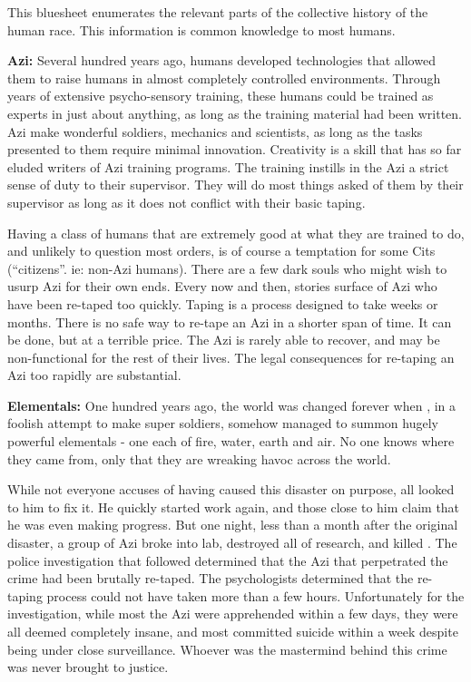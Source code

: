 \documentclass[blue]{elementals}
\begin{document}
\name{\bHumanHistory{}}

This bluesheet enumerates the relevant parts of the collective history of the human race. This information is common knowledge to most humans.

{\bf Azi:} %
Several hundred years ago, humans developed technologies that allowed them to raise humans in almost completely controlled environments. Through years of extensive psycho-sensory training, these humans could be trained as experts in just about anything, as long as the training material had been written. Azi make wonderful soldiers, mechanics and scientists, as long as the tasks presented to them require minimal innovation. Creativity is a skill that has so far eluded writers of Azi training programs. The training instills in the Azi a strict sense of duty to their supervisor. They will do most things asked of them by their supervisor as long as it does not conflict with their basic taping.

Having a class of humans that are extremely good at what they are trained to do, and unlikely to question most orders, is of course a temptation for some Cits (``citizens''. ie: non-Azi humans). There are a few dark souls who might wish to usurp Azi for their own ends. Every now and then, stories surface of Azi who have been re-taped too quickly.  Taping is a process designed to take weeks or months. There is no safe way to re-tape an Azi in a shorter span of time. It can be done, but at a terrible price. The Azi is rarely able to recover, and may be non-functional for the rest of their lives.  The legal consequences for re-taping an Azi too rapidly are substantial. %

{\bf Elementals:}
One hundred years ago, the world was changed forever when \cGrandfather{}, in a foolish attempt to make super soldiers, somehow managed to summon hugely powerful elementals - one each of fire, water, earth and air. No one knows where they came from, only that they are wreaking havoc across the world. 

While not everyone accuses \cGrandfather{} of having caused this disaster on purpose, all looked to him to fix it. He quickly started work again, and those close to him claim that he was even making progress. But one night, less than a month after the original disaster, a group of Azi broke into \cGrandfather{\their} lab, destroyed all of \cGrandfather{\their} research, and killed \cGrandfather{\them}. The police investigation that followed determined that the Azi that perpetrated the crime had been brutally re-taped. The psychologists determined that the re-taping process could not have taken more than a few hours. Unfortunately for the investigation, while most the Azi were apprehended within a few days, they were all deemed completely insane, and most committed suicide within a week despite being under close surveillance. Whoever was the mastermind behind this crime was never brought to justice.
\end{document}
